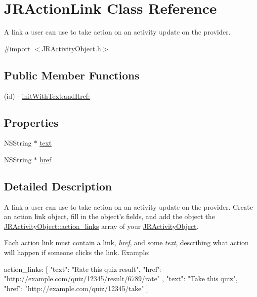 \hypertarget{interface_j_r_action_link}{
\section{JRActionLink Class Reference}
\label{interface_j_r_action_link}
}


A link a user can use to take action on an activity update on the provider.  




{\ttfamily \#import $<$JRActivityObject.h$>$}

\subsection*{Public Member Functions}
\begin{DoxyCompactItemize}
\item 
(id) -\/ \hyperlink{interface_j_r_action_link_ae1f056641fd3302efbf23d89452553a5}{initWithText:andHref:}
\end{DoxyCompactItemize}
\subsection*{Properties}
\begin{DoxyCompactItemize}
\item 
NSString $\ast$ \hyperlink{interface_j_r_action_link_a062c02005f1c35e651ffbcab51c50b21}{text}
\item 
NSString $\ast$ \hyperlink{interface_j_r_action_link_a45489781731e5965e20fa66af0bd3072}{href}
\end{DoxyCompactItemize}


\subsection{Detailed Description}
A link a user can use to take action on an activity update on the provider. Create an action link object, fill in the object's fields, and add the object the \hyperlink{interface_j_r_activity_object_aa5c629e1c3b8306b2532ab647f7f6ec5}{JRActivityObject::action\_\-links} array of your \hyperlink{interface_j_r_activity_object}{JRActivityObject}.

Each action link must contain a link, {\itshape href\/}, and some {\itshape text\/}, describing what action will happen if someone clicks the link. Example: 
\begin{DoxyCode}
 action_links: 
 [
   {
     "text": "Rate this quiz result",
     "href": "http://example.com/quiz/12345/result/6789/rate"
   },
   {
     "text": "Take this quiz",
     "href": "http://example.com/quiz/12345/take"
   }
 ]
\end{DoxyCode}
 

